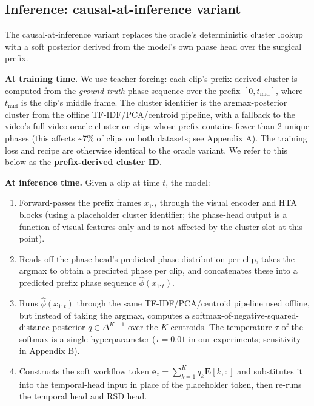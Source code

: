 \subsection{Inference: causal-at-inference variant}\label{inference-causal-at-inference-variant}

The causal-at-inference variant replaces the oracle's deterministic
cluster lookup with a soft posterior derived from the model's own phase
head over the surgical prefix.

\textbf{At training time.} We use teacher forcing: each clip's
prefix-derived cluster is computed from the \emph{ground-truth} phase
sequence over the prefix \([0, t_{\text{mid}}]\), where
\(t_{\text{mid}}\) is the clip's middle frame. The cluster identifier is
the argmax-posterior cluster from the offline TF-IDF/PCA/centroid
pipeline, with a fallback to the video's full-video oracle cluster on
clips whose prefix contains fewer than 2 unique phases (this affects
\textasciitilde7\% of clips on both datasets; see Appendix A). The
training loss and recipe are otherwise identical to the oracle variant.
We refer to this below as the \textbf{prefix-derived cluster ID}.

\textbf{At inference time.} Given a clip at time \(t\), the model:

\begin{enumerate}
\def\labelenumi{\arabic{enumi}.}
\tightlist
\item
  Forward-passes the prefix frames \(x_{1:t}\) through the visual
  encoder and HTA blocks (using a placeholder cluster identifier; the
  phase-head output is a function of visual features only and is not
  affected by the cluster slot at this point).
\item
  Reads off the phase-head's predicted phase distribution per clip,
  takes the argmax to obtain a predicted phase per clip, and
  concatenates these into a predicted prefix phase sequence
  \(\hat\phi(x_{1:t})\).
\item
  Runs \(\hat\phi(x_{1:t})\) through the same TF-IDF/PCA/centroid
  pipeline used offline, but instead of taking the argmax, computes a
  softmax-of-negative-squared-distance posterior \(q \in \Delta^{K-1}\)
  over the \(K\) centroids. The temperature \(\tau\) of the softmax is a
  single hyperparameter (\(\tau = 0.01\) in our experiments; sensitivity
  in Appendix B).
\item
  Constructs the soft workflow token
  \(\mathbf{e}_z = \sum_{k=1}^K q_k \mathbf{E}[k,
  :]\) and substitutes it into the temporal-head input in place of the
  placeholder token, then re-runs the temporal head and RSD head.
\end{enumerate}

